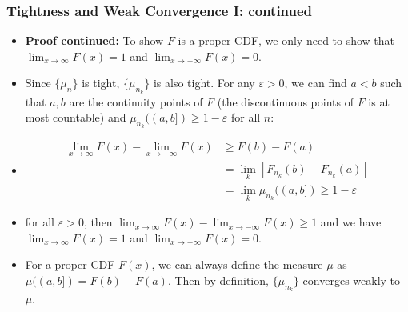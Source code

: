 \documentclass[handout]{beamer}
\begin{document}
  \frame
{
  \frametitle{Tightness and Weak Convergence I: continued}

 \begin{itemize}

\item<1-> \textbf{Proof continued:} To show $F$ is a proper CDF, we only need to show that $\lim_{x\rightarrow \infty} F(x)=1$ and $\lim_{x\rightarrow -\infty} F(x)=0$.

\item<2->[-] Since $\{\mu_n\}$ is tight, $\{\mu_{n_k}\}$ is also tight. For any $\varepsilon>0$, we can find $a<b$ such that $a,b$ are the continuity points of $F$ (the discontinuous points of $F$ is at most countable) and $\mu_{n_k} ((a,b])\geq 1-\varepsilon$ for all $n$:
\item<3->[]\begin{align*}
\lim_{x\rightarrow \infty} F(x)-\lim_{x\rightarrow -\infty} F(x) & \geq F(b)-F(a)  \\ & =\lim_k [F_{n_k} (b)-F_{n_k} (a) ] \\ & =\lim_k \mu_{n_k} ((a,b])\geq 1-\varepsilon
\end{align*}
\item<4->[] for all $\varepsilon>0$, then $\lim_{x\rightarrow \infty} F(x)-\lim_{x\rightarrow -\infty} F(x) \geq 1$ and we have $\lim_{x\rightarrow \infty} F(x)=1$ and $\lim_{x\rightarrow -\infty} F(x)=0$.

\item<4->[-] For a proper CDF $F(x)$, we can always define the measure $\mu$ as $\mu((a,b])=F(b)-F(a)$. Then by definition, $\{\mu_{n_k}\}$ converges weakly to $\mu$. 
 
\end{itemize}
 }
 
\end{document}
